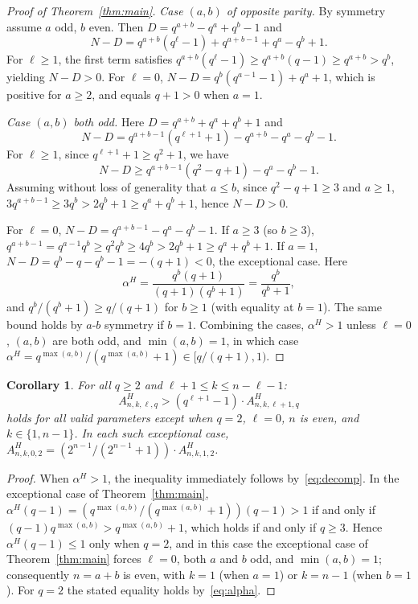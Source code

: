 \documentclass[10pt,a4paper]{amsart}
\newtheorem{corollary}[theorem]{Corollary}
\begin{document}
\begin{proof}[Proof of Theorem~\ref{thm:main}]
\emph{Case $(a, b)$ of opposite parity.}
By symmetry assume $a$ odd, $b$ even. Then $D = q^{a+b}-q^{a}+q^{b}-1$ and
\[
  N - D = q^{a+b}(q^{\ell}-1) + q^{a+b-1} + q^{a} - q^{b} + 1.
\]
For $\ell\geq 1$, the first term satisfies $q^{a+b}(q^{\ell}-1) \geq q^{a+b}(q-1) \geq q^{a+b} > q^{b}$,
yielding $N-D > 0$.
For $\ell = 0$, $N - D = q^{b}(q^{a-1}-1) + q^{a} + 1$,
which is positive for $a \geq 2$, and equals $q+1 > 0$ when $a = 1$.

\emph{Case $(a, b)$ both odd.}
Here $D = q^{a+b}+q^{a}+q^{b}+1$ and
\[
  N - D = q^{a+b-1}(q^{\ell+1}+1) - q^{a+b} - q^{a} - q^{b} - 1.
\]
For $\ell \geq 1$, since $q^{\ell+1}+1 \geq q^{2}+1$, we have
\[
  N - D \geq q^{a+b-1}(q^{2}-q+1) - q^{a} - q^{b} - 1.
\]
Assuming without loss of generality that $a \leq b$, since $q^{2}-q+1 \geq 3$ and $a \geq 1$,
$3q^{a+b-1} \geq 3q^{b} > 2q^{b}+1 \geq q^{a}+q^{b}+1$, hence $N-D > 0$.

For $\ell = 0$, $N - D = q^{a+b-1} - q^{a} - q^{b} - 1$.
If $a \geq 3$ (so $b \geq 3$), $q^{a+b-1} = q^{a-1}q^{b} \geq q^{2}q^{b} \geq 4q^{b} > 2q^{b}+1 \geq q^{a}+q^{b}+1$.
If $a = 1$, $N - D = q^{b} - q - q^{b} - 1 = -(q+1) < 0$, the exceptional case.
Here
\[
  \alpha^H = \frac{q^{b}(q+1)}{(q+1)(q^{b}+1)} = \frac{q^{b}}{q^{b}+1},
\]
and $q^{b}/(q^{b}+1) \geq q/(q+1)$ for $b \geq 1$ (with equality at $b=1$).
The same bound holds by $a$-$b$ symmetry if $b = 1$.
Combining the cases, $\alpha^H > 1$ unless $\ell=0$, $(a,b)$ are both odd, and
$\min(a,b) = 1$, in which case $\alpha^H = q^{\max(a,b)}/(q^{\max(a,b)}+1) \in [q/(q+1), 1)$.
\end{proof}


\begin{corollary}\label{cor:Amonotone-strict}
For all $q \geq 2$ and $\ell+1\leq k\leq n-\ell-1$:
\[
  A^H_{n,k,\ell,q} > (q^{\ell+1}-1)\cdot A^H_{n,k,\ell+1,q}
\]
holds for all valid parameters except when $q = 2$, $\ell = 0$, $n$ is even, and $k\in\{1, n-1\}$.
In each such exceptional case,
$A^H_{n,k,0,2} = (2^{n-1}/(2^{n-1}+1))\cdot A^H_{n,k,1,2}$.
\end{corollary}

\begin{proof}
When $\alpha^H > 1$, the inequality immediately follows by~\eqref{eq:decomp}.
In the exceptional case of Theorem~\ref{thm:main},
$\alpha^H(q-1) = (q^{\max(a,b)}/(q^{\max(a,b)}+1))(q-1) > 1$
if and only if $(q-1)q^{\max(a,b)} > q^{\max(a,b)}+1$, which holds if and only if
$q\geq 3$. Hence $\alpha^H(q-1) \leq 1$ only when $q=2$, and in this case the
exceptional case of Theorem~\ref{thm:main} forces $\ell = 0$, both $a$ and $b$
odd, and $\min(a,b) = 1$; consequently $n = a + b$ is even, with $k = 1$ (when
$a = 1$) or $k = n - 1$ (when $b = 1$). For $q = 2$ the stated equality holds
by~\eqref{eq:alpha}.
\end{proof}
\end{document}
